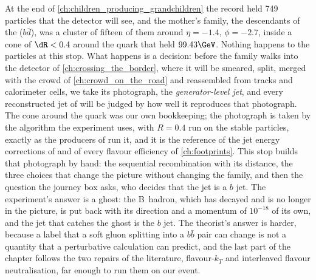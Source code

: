 At the end of \cref{ch:children_producing_grandchildren} the record held
749 particles that the detector will see, and the mother's family, the
descendants of the \Bbar ($b\bar d$), was a cluster of fifteen of them
around $\eta=-1.4$, $\phi=-2.7$, inside a cone of $\dR<0.4$ around the
quark that held $99.43\GeV$. Nothing happens to the particles at this
stop. What happens is a decision: before the family walks into the
detector of \cref{ch:crossing_the_border}, where it will be smeared,
split, merged with the crowd of \cref{ch:crowd_on_the_road} and
reassembled from tracks and calorimeter cells, we take its photograph,
the \emph{generator-level jet}, and every reconstructed jet of
 will be judged by how well it
reproduces that photograph. The cone around the quark was our own
bookkeeping; the photograph is taken by the algorithm the experiment
uses, \antikt with $R=0.4$ run on the stable particles, exactly as the
 producers of \CMSSW run it, and it is the reference of the
jet energy corrections of 
and of every flavour efficiency of \cref{ch:footprints}. This stop builds
that photograph by hand: the sequential recombination with its distance,
the three choices that change the picture without changing the family,
and then the question the journey box asks, who decides that the jet is
a $b$ jet. The experiment's answer is a ghost: the B~hadron, which has
decayed and is no longer in the picture, is put back with its direction
and a momentum of $10^{-18}$ of its own, and the jet that catches the
ghost is the $b$ jet. The theorist's answer is harder, because a label
that a soft gluon splitting into a $b\bar b$ pair can change is not a
quantity that a perturbative calculation can predict, and the last part
of the chapter follows the two repairs of the literature, flavour-$k_T$
and interleaved flavour neutralisation, far enough to run them on our
event.

